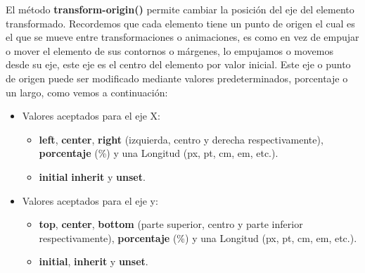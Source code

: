 El método \textbf{transform-origin()} permite cambiar la posición del eje del elemento transformado. Recordemos que cada elemento tiene un punto de origen el cual es el que se mueve entre transformaciones o animaciones, es como en vez de empujar o mover el elemento de sus contornos o márgenes, lo empujamos o movemos desde su eje, este eje es el centro del elemento por valor inicial. Este eje o punto de origen puede ser modificado mediante valores predeterminados, porcentaje o un largo, como vemos a continuación:
\begin{itemize}
    \item Valores aceptados para el eje X:
    \begin{itemize}
        \item \textbf{left}, \textbf{center}, \textbf{right} (izquierda, centro y derecha respectivamente), \textbf{porcentaje} (\%) y una Longitud (px, pt, cm, em, etc.).
        \item \textbf{initial} \textbf{inherit} y \textbf{unset}.
    \end{itemize}
    \item Valores aceptados para el eje y:
    \begin{itemize}
        \item \textbf{top}, \textbf{center}, \textbf{bottom} (parte superior, centro y parte inferior respectivamente), \textbf{porcentaje} (\%) y una Longitud (px, pt, cm, em, etc.).
        \item \textbf{initial}, \textbf{inherit} y \textbf{unset}.
    \end{itemize}
\end{itemize}

